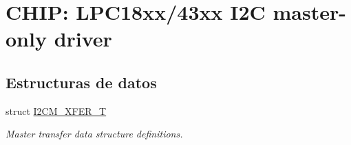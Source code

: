 \hypertarget{group___i2_c_m__18_x_x__43_x_x}{}\section{C\+H\+IP\+: L\+P\+C18xx/43xx I2C master-\/only driver}
\label{group___i2_c_m__18_x_x__43_x_x}
\subsection*{Estructuras de datos}
\begin{DoxyCompactItemize}
\item 
struct \hyperlink{struct_i2_c_m___x_f_e_r___t}{I2\+C\+M\+\_\+\+X\+F\+E\+R\+\_\+T}
\begin{DoxyCompactList}\small\item\em Master transfer data structure definitions. \end{DoxyCompactList}\end{DoxyCompactItemize}
